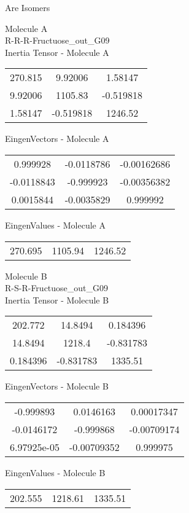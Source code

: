 \begin{center}
\vtab
\vtab
\textcolor{NavyBlue}{\Large Are Isomers}
\end{center}
\newpage
\begin{multicols}{2}
\begin{center}
Molecule A \\ 
R-R-R-Fructuose\_out\_G09
\\
Inertia Tensor - Molecule A \\
\vtab
\begin{tabular}{|c c c|}
270.815	 & 	9.92006	 & 	1.58147	 \\
9.92006	 & 	1105.83	 & 	-0.519818	 \\
1.58147	 & 	-0.519818	 & 	1246.52
\end{tabular}

\vtab
 EingenVectors - Molecule A     \\
\vtab
\begin{tabular}{|c c c|}
0.999928	 & 	-0.0118786	 & 	-0.00162686	 \\
-0.0118843	 & 	-0.999923	 & 	-0.00356382	 \\
0.0015844	 & 	-0.0035829	 & 	0.999992
\end{tabular}

\vtab
 EingenValues - Molecule A     \\
\vtab
\begin{tabular}{|c c c|}
270.695	 & 	1105.94	 & 	1246.52
\end{tabular}
\columnbreak

Molecule B \\ 
R-S-R-Fructuose\_out\_G09
\\
Inertia Tensor - Molecule B \\
\vtab
\begin{tabular}{|c c c|}
202.772	 & 	14.8494	 & 	0.184396	 \\
14.8494	 & 	1218.4	 & 	-0.831783	 \\
0.184396	 & 	-0.831783	 & 	1335.51
\end{tabular}

\vtab
 EingenVectors - Molecule B     \\
\vtab
\begin{tabular}{|c c c|}
-0.999893	 & 	0.0146163	 & 	0.00017347	 \\
-0.0146172	 & 	-0.999868	 & 	-0.00709174	 \\
6.97925e-05	 & 	-0.00709352	 & 	0.999975
\end{tabular}

\vtab
 EingenValues - Molecule B     \\
\vtab
\begin{tabular}{|c c c|}
202.555	 & 	1218.61	 & 	1335.51
\end{tabular}

\end{center}
\end{multicols}
